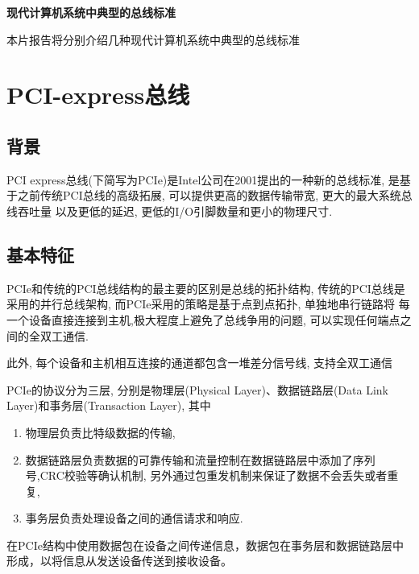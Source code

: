 \documentclass[14pt]{article}
\begin{document}
\fontsize{13pt}{18pt}\selectfont


\pagestyle{fancy}


\begin{center}
\huge{\bf{现代计算机系统中典型的总线标准}}
\end{center}

本片报告将分别介绍几种现代计算机系统中典型的总线标准

\section{PCI-express总线}
\subsection{背景}
PCI express总线(下简写为PCIe)是Intel公司在2001提出的一种新的总线标准, 是基于之前传统PCI总线的高级拓展, 可以提供更高的数据传输带宽, 更大的最大系统总线吞吐量
以及更低的延迟, 更低的I/O引脚数量和更小的物理尺寸.

\subsection{基本特征}
PCIe和传统的PCI总线结构的最主要的区别是总线的拓扑结构, 传统的PCI总线是采用的并行总线架构, 而PCIe采用的策略是基于点到点拓扑, 单独地串行链路将
每一个设备直接连接到主机,极大程度上避免了总线争用的问题, 可以实现任何端点之间的全双工通信.\par
此外, 每个设备和主机相互连接的通道都包含一堆差分信号线, 支持全双工通信\par
PCIe的协议分为三层, 分别是物理层(Physical Layer)、数据链路层(Data Link Layer)和事务层(Transaction Layer), 其中
\begin{enumerate}
  \item 物理层负责比特级数据的传输, 
  \item 数据链路层负责数据的可靠传输和流量控制在数据链路层中添加了序列号,CRC校验等确认机制, 另外通过包重发机制来保证了数据不会丢失或者重复, 
  \item 事务层负责处理设备之间的通信请求和响应.
\end{enumerate}
在PCIe结构中使用数据包在设备之间传递信息，数据包在事务层和数据链路层中形成，以将信息从发送设备传送到接收设备。
\newpage
\end{document}
